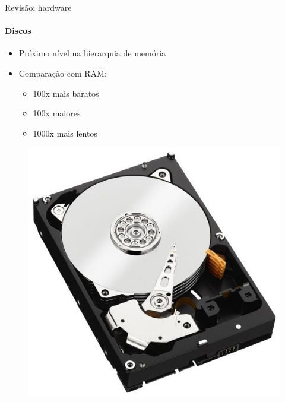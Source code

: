 \documentclass{beamer}
\begin{document}
\begin{frame}{Revisão: hardware}
	\framesubtitle{Discos}
	\begin{itemize}
		\item Próximo nível na hierarquia de memória
		\item Comparação com RAM:
		\begin{itemize}
			\item 100x mais baratos
			\item 100x maiores
			\item 1000x mais lentos
		\end{itemize}
	\end{itemize}
	\begin{figure}
		\includegraphics[width=0.3\paperwidth]{resources/hd}
	\end{figure}
\end{frame}
\end{document}
